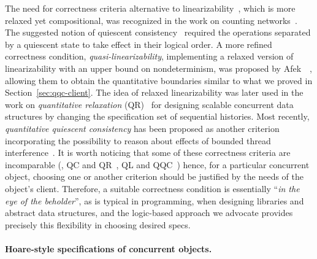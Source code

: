 The need for correctness criteria alternative to
linearizability~\cite{Herlihy-Wing:TOPLAS90}, which is more relaxed
yet compositional, was recognized in the work on counting
networks~\cite{Aspnes-al:JACM94}.
%
The suggested notion of quiescent
consistency~\cite{Shavit-Zemah:TOPLAS96} required the operations
separated by a quiescent state to take effect in their logical order.
%
%
A more refined correctness condition, \emph{quasi-linearizability},
implementing a relaxed version of linearizability with an upper bound
on nondeterminism, was proposed by Afek~\etal~\cite{Afek-al:OPODIS10},
allowing them to obtain the quantitative boundaries similar to what we
proved in Section~\ref{sec:qqc-client}.
%
The idea of relaxed linearizability was later used in the work on
\emph{quantitative relaxation} (QR)~\cite{Henzinger-al:POPL13} for
designing scalable concurrent data structures by changing the
specification set of sequential histories.
%
Most recently, \emph{quantitative quiescent consistency} has been
proposed as another criterion incorporating the possibility to reason
about effects of bounded thread
interference~\cite{Jagadeesan-Riely:ICALP14}.
%
It is worth noticing that some of these correctness criteria are
incomparable (\eg, QC and QR~\cite{Henzinger-al:POPL13}, QL and
QQC~\cite{Jagadeesan-Riely:ICALP14}) hence, for a particular
concurrent object, choosing one or another criterion should be
justified by the needs of the object's client. Therefore, a suitable
correctness condition is essentially ``\emph{in the eye of the
  beholder}'', as is typical in programming, when designing libraries
and abstract data structures, and the logic-based approach we advocate
provides precisely this flexibility in choosing desired specs.


\paragraph{Hoare-style specifications of concurrent objects.}
\label{sec:related-logic-based}


